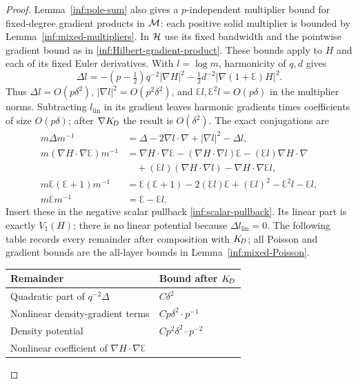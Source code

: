 \begin{proof}
Lemma~\ref{inf:pole-sum} also gives a $p$-independent multiplier
bound for fixed-degree gradient products in $\mathcal M$: each positive
solid multiplier is bounded by Lemma~\ref{inf:mixed-multipliers}.
In $\mathcal{H}$ use its fixed bandwidth and the pointwise gradient bound
as in \eqref{inf:Hilbert-gradient-product}. These bounds apply to
$H$ and each of its fixed Euler derivatives.
With $l=\log m$, harmonicity of $q,d$ gives
\[
 \Delta l=-(p-\tfrac12)q^{-2}|\nabla H|^2
       -\tfrac12d^{-2}|\nabla(1+\Euler)H|^2.
\]
Thus $\Delta l=O(p\delta^2)$,
$|\nabla l|^2=O(p^2\delta^2)$, and
$\Euler l,\Euler^2l=O(p\delta)$ in the multiplier norms.
Subtracting $l_{\mathrm{lin}}$ in its gradient leaves harmonic
gradients times coefficients of size $O(p\delta)$; after
$\nabla K_{\!D}$ the result is $O(\delta^2)$.
The exact conjugations are
\begin{align*}
 m\Delta m^{-1}&=\Delta-2\nabla l\cdot\nabla
                            +|\nabla l|^2-\Delta l,\\
 m(\nabla H\cdot\nabla\Euler)m^{-1}
 &=\nabla H\cdot\nabla\Euler-(\nabla H\cdot\nabla l)\Euler
       -(\Euler l)\nabla H\cdot\nabla\\
 &\quad +(\Euler l)(\nabla H\cdot\nabla l)
                         -\nabla H\cdot\nabla\Euler l,\\
 m\Euler(\Euler+1)m^{-1}
 &=\Euler(\Euler+1)-2(\Euler l)\Euler
             +(\Euler l)^2-\Euler^2l-\Euler l,\\
 m\Euler m^{-1}&=\Euler-\Euler l.
\end{align*}
Insert these in the negative scalar pullback
\eqref{inf:scalar-pullback}. Its linear part is exactly $V_1(H)$;
there is no linear potential because $\Delta l_{\mathrm{lin}}=0$.
The following table records every remainder after composition with
$K_{\!D}$; all Poisson and gradient bounds are the all-layer bounds in
Lemma~\ref{inf:mixed-Poisson}.
\begin{center}\small\normalfont
\begin{tabular}{@{}>{\raggedright\arraybackslash}p{}>{\raggedright\arraybackslash}p{}@{}}
\toprule Remainder & Bound after $K_{\!D}$\\\midrule
Quadratic part of $q^{-2}\Delta$ & $C\delta^2$\\
Nonlinear density-gradient terms & $Cp\delta^2\cdot p^{-1}$\\
Density potential & $Cp^2\delta^2\cdot p^{-2}$\\
Nonlinear coefficient of $\nabla H\cdot\nabla\Euler$

\end{tabular}
\end{center}
\end{proof}
